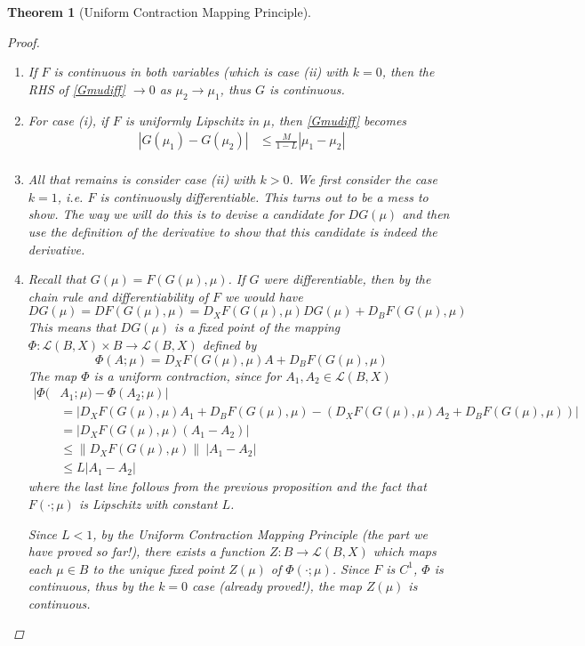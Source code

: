 \documentclass[12pt]{amsart}         %
\newtheorem{theorem}{Theorem}[section]
\theoremstyle{remark}
\begin{document}
\begin{theorem}[Uniform Contraction Mapping Principle]
\begin{proof}
\begin{enumerate}
\item If $F$ is continuous in both variables (which is case (ii) with $k = 0$, then the RHS of \eqref{Gmudiff} $\rightarrow 0$ as $\mu_2 \rightarrow \mu_1$, thus $G$ is continuous.

\item For case (i), if $F$ is uniformly Lipschitz in $\mu$, then \eqref{Gmudiff} becomes 
\begin{align*}
|G(\mu_1) - G(\mu_2)| &\leq \frac{M}{1-L} |\mu_1 - \mu_2| \\
\end{align*}

\item All that remains is consider case (ii) with $k > 0$. We first consider the case $k = 1$, i.e. $F$ is continuously differentiable. This turns out to be a mess to show. The way we will do this is to devise a candidate for $DG(\mu)$ and then use the definition of the derivative to show that this candidate is indeed the derivative.

\item Recall that $G(\mu) = F(G(\mu),\mu)$. If $G$ were differentiable, then by the chain rule and differentiability of $F$ we would have
\[
DG(\mu) = DF(G(\mu),\mu) = D_X F(G(\mu), \mu)DG(\mu) + D_B F(G(\mu), \mu)
\]
This means that $DG(\mu)$ is a fixed point of the mapping $\Phi: \mathcal{L}(B, X) \times B \rightarrow \mathcal{L}(B, X)$ defined by
\[
\Phi(A; \mu) = D_X F(G(\mu), \mu) A + D_B F(G(\mu), \mu)
\]
The map $\Phi$ is a uniform contraction, since for $A_1, A_2 \in \mathcal{L}(B, X)$
\begin{align*}
|\Phi(&A_1; \mu) - \Phi(A_2; \mu)| \\
&= | D_X F(G(\mu), \mu) A_1 + D_B F(G(\mu), \mu) - (D_X F(G(\mu), \mu) A_2 + D_B F(G(\mu), \mu)) | \\
&= | D_X F(G(\mu), \mu) (A_1 - A_2) | \\
&\leq \|D_X F(G(\mu), \mu) \|\:|A_1 - A_2| \\
&\leq L |A_1 - A_2|
\end{align*}
where the last line follows from the previous proposition and the fact that $F(\cdot; \mu)$ is Lipschitz with constant $L$.

Since $L < 1$, by the Uniform Contraction Mapping Principle (the part we have proved so far!), there exists a function $Z: B \rightarrow \mathcal{L}(B, X)$ which maps each $\mu \in B$ to the unique fixed point $Z(\mu)$ of $\Phi(\cdot; \mu)$. Since $F$ is $C^1$, $\Phi$ is continuous, thus by the $k = 0$ case (already proved!), the map $Z(\mu)$ is continuous.
    

\end{enumerate}
\end{proof}
\end{theorem}
\end{document}
